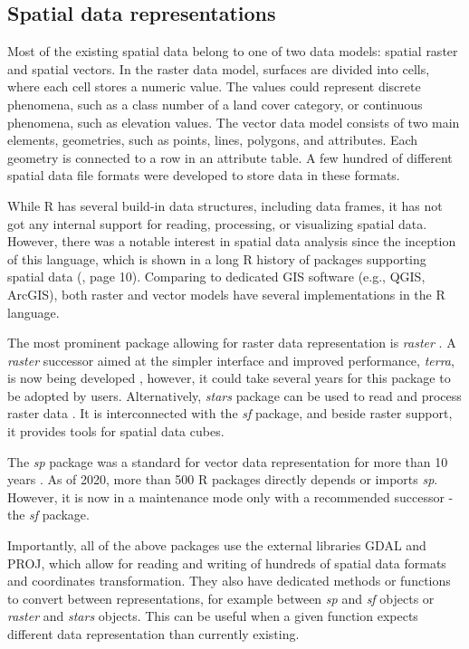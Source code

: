 \documentclass[smallextended]{svjour3}       %
\begin{document}
\hypertarget{sec:spatrep}{%
\subsection{Spatial data representations}\label{sec:spatrep}}

Most of the existing spatial data belong to one of two data models: spatial raster and spatial vectors.
In the raster data model, surfaces are divided into cells, where each cell stores a numeric value.
The values could represent discrete phenomena, such as a class number of a land cover category, or continuous phenomena, such as elevation values.
The vector data model consists of two main elements, geometries, such as points, lines, polygons, and attributes.
Each geometry is connected to a row in an attribute table.
A few hundred of different spatial data file formats were developed to store data in these formats.

While R has several build-in data structures, including data frames, it has not got any internal support for reading, processing, or visualizing spatial data.
However, there was a notable interest in spatial data analysis since the inception of this language, which is shown in a long R history of packages supporting spatial data (\cite{Lovelace2019}, page 10).
Comparing to dedicated GIS software (e.g., QGIS, ArcGIS), both raster and vector models have several implementations in the R language.

The most prominent package allowing for raster data representation is \emph{raster} \cite{Hijmans2019}.
A \emph{raster} successor aimed at the simpler interface and improved performance, \emph{terra}, is now being developed \cite{R-terra}, however, it could take several years for this package to be adopted by users.
Alternatively, \emph{stars} package can be used to read and process raster data \cite{Pebesma2019}.
It is interconnected with the \emph{sf} package, and beside raster support, it provides tools for spatial data cubes.

The \emph{sp} package was a standard for vector data representation for more than 10 years \cite{Pebesma2005,Bivand2013}.
As of 2020, more than 500 R packages directly depends or imports \emph{sp}.
However, it is now in a maintenance mode only with a recommended successor - the \emph{sf} package.

Importantly, all of the above packages use the external libraries GDAL and PROJ, which allow for reading and writing of hundreds of spatial data formats and coordinates transformation.
They also have dedicated methods or functions to convert between representations, for example between \emph{sp} and \emph{sf} objects or \emph{raster} and \emph{stars} objects.
This can be useful when a given function expects different data representation than currently existing.
\end{document}

